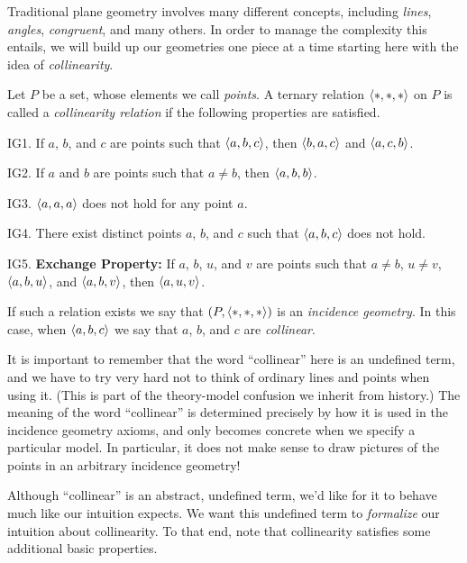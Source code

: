 Traditional plane geometry involves many different concepts, including \emph{lines}, \emph{angles}, \emph{congruent}, and many others.
In order to manage the complexity this entails, we will build up our geometries one piece at a time starting here with the idea of \emph{collinearity}.

\begin{dfn} \label{dfn:incidence-geometry}
Let \(P\) be a set, whose elements we call \emph{points}.
A ternary relation \(\langle \ast, \ast, \ast \rangle\) on \(P\) is called a \emph{collinearity relation} if the following properties are satisfied.
\begin{proplist}
\item[IG1.] If \(a\), \(b\), and \(c\) are points such that \(\langle a, b, c \rangle\), then \(\langle b, a, c \rangle\) and \(\langle a, c, b \rangle\).
\item[IG2.] If \(a\) and \(b\) are points such that \(a \neq b\), then \(\langle a, b, b \rangle\).
\item[IG3.] \(\langle a, a, a \rangle\) does not hold for any point \(a\).
\item[IG4.] There exist distinct points \(a\), \(b\), and \(c\) such that \(\langle a, b, c \rangle\) does not hold.
\item[IG5.] \textbf{Exchange Property:} If \(a\), \(b\), \(u\), and \(v\) are points such that \(a \neq b\), \(u \neq v\), \(\langle a, b, u \rangle\), and \(\langle a, b, v \rangle\), then \(\langle a, u, v \rangle\).
\end{proplist}
If such a relation exists we say that \((P, \langle \ast, \ast, \ast \rangle)\) is an \emph{incidence geometry}.
In this case, when \(\langle a, b, c \rangle\) we say that \(a\), \(b\), and \(c\) are \emph{collinear}.
\end{dfn}

It is important to remember that the word ``collinear'' here is an undefined term, and we have to try very hard not to think of ordinary lines and points when using it.
(This is part of the theory-model confusion we inherit from history.)
The meaning of the word ``collinear'' is determined precisely by how it is used in the incidence geometry axioms, and only becomes concrete when we specify a particular model.
In particular, it does not make sense to draw pictures of the points in an arbitrary incidence geometry!

Although ``collinear'' is an abstract, undefined term, we'd like for it to behave much like our intuition expects.
We want this undefined term to \emph{formalize} our intuition about collinearity.
To that end, note that collinearity satisfies some additional basic properties.

